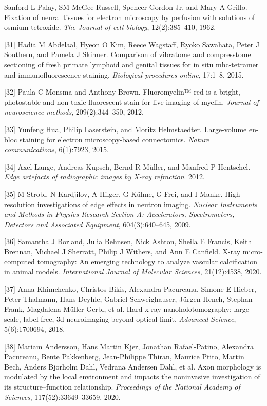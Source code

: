 \documentclass{article}
\begin{document}
\begin{hangpars}
[30] Sanford L Palay, SM McGee-Russell, Spencer Gordon Jr, and Mary A Grillo. Fixation of neural tissues for electron microscopy by perfusion with solutions of osmium tetroxide. \emph{The Journal of cell biology}, 12(2):385–410, 1962.

[31] Hadia M Abdelaal, Hyeon O Kim, Reece Wagstaff, Ryoko Sawahata, Peter J Southern, and Pamela J Skinner. Comparison of vibratome and compresstome sectioning of fresh primate lymphoid and genital tissues for in situ mhc-tetramer and immunofluorescence staining. \emph{Biological procedures online}, 17:1–8, 2015.

[32] Paula C Monsma and Anthony Brown. Fluoromyelin™ red is a bright, photostable and non-toxic fluorescent stain for live imaging of myelin. \emph{Journal of neuroscience methods}, 209(2):344–350, 2012.

[33] Yunfeng Hua, Philip Laserstein, and Moritz Helmstaedter. Large-volume en-bloc staining for electron microscopy-based connectomics. \emph{Nature communications}, 6(1):7923, 2015.

[34] Axel Lange, Andreas Kupsch, Bernd R Müller, and Manfred P Hentschel. \emph{Edge artefacts of radiographic images by X-ray refraction}. 2012.

[35] M Strobl, N Kardjilov, A Hilger, G Kühne, G Frei, and I Manke. High-resolution investigations of edge effects in neutron imaging. \emph{Nuclear Instruments and Methods in Physics Research Section A: Accelerators, Spectrometers, Detectors and Associated Equipment}, 604(3):640–645, 2009.

[36] Samantha J Borland, Julia Behnsen, Nick Ashton, Sheila E Francis, Keith Brennan, Michael J Sherratt, Philip J Withers, and Ann E Canfield. X-ray micro-computed tomography: An emerging technology to analyze vascular calcification in animal models. \emph{International Journal of Molecular Sciences}, 21(12):4538, 2020.

[37] Anna Khimchenko, Christos Bikis, Alexandra Pacureanu, Simone E Hieber, Peter Thalmann, Hans Deyhle, Gabriel Schweighauser, Jürgen Hench, Stephan Frank, Magdalena Müller-Gerbl, et al. Hard x-ray nanoholotomography: large-scale, label-free, 3d neuroimaging beyond optical limit. \emph{Advanced Science}, 5(6):1700694, 2018.

[38] Mariam Andersson, Hans Martin Kjer, Jonathan Rafael-Patino, Alexandra Pacureanu, Bente Pakkenberg, Jean-Philippe Thiran, Maurice Ptito, Martin Bech, Anders Bjorholm Dahl, Vedrana Andersen Dahl, et al. Axon morphology is modulated by the local environment and impacts the noninvasive investigation of its structure–function relationship. \emph{Proceedings of the National Academy of Sciences}, 117(52):33649–33659, 2020.


\end{hangpars}
\end{document}
